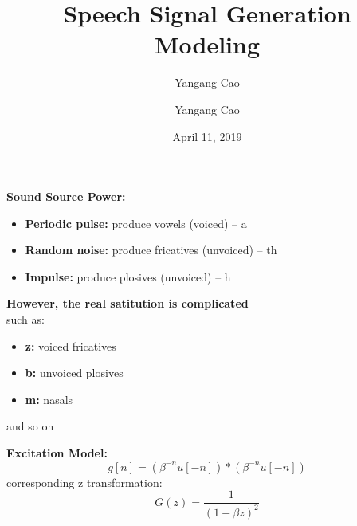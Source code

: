 \documentclass[10pt,a4paper,oneside]{beamer}
\author{Yangang Cao}
\author{Yangang Cao}
\title{Speech Signal Generation Modeling}
\date{April 11, 2019}
\begin{document}
	
\frame[plain]{\titlepage}

\begin{frame}
\vspace{0.5cm}
{\bfseries Sound Source Power:}
\vspace{0.3cm}
\begin{itemize}
	\item  {\bfseries Periodic pulse:} produce vowels (voiced) -- a
	\item {\bfseries Random noise:} produce fricatives (unvoiced) -- th
	\item {\bfseries Impulse:} produce plosives (unvoiced) -- h
\end{itemize}
\vspace{0.5cm}
{\bfseries However, the real satitution is complicated}\\
such as:
\begin{itemize}
	\item  {\bfseries z:} voiced fricatives
	\item {\bfseries b:} unvoiced plosives
	\item {\bfseries m:} nasals
\end{itemize}
and so on
\end{frame}

\begin{frame}
\vspace{0.5cm}
{\bfseries Excitation Model:}
\vspace{0.1cm}
\[
g[n] = (\beta^{-n}u[-n])* (\beta^{-n}u[-n])
\]
corresponding z transformation:
\[
 G(z)=\frac{1}{(1-\beta z)^2}
\]
\end{frame}
\end{document}
